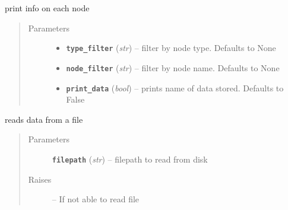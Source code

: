 \documentclass[letterpaper,10pt,english]{sphinxmanual}
\begin{document}
\begin{fulllineitems}
\begin{fulllineitems}
\end{fulllineitems}


\begin{fulllineitems}
\label{zBuilder:zBuilder.nodeCollection.NodeCollection.print_}
print info on each node
\begin{quote}\begin{description}
\item[{Parameters}] \leavevmode\begin{itemize}
\item {} 
\textbf{\texttt{type\_filter}} (\emph{str}) -- filter by node type.  Defaults to None

\item {} 
\textbf{\texttt{node\_filter}} (\emph{str}) -- filter by node name. Defaults to None

\item {} 
\textbf{\texttt{print\_data}} (\emph{bool}) -- prints name of data stored.  Defaults to False

\end{itemize}

\end{description}\end{quote}

\end{fulllineitems}


\begin{fulllineitems}
\label{zBuilder:zBuilder.nodeCollection.NodeCollection.retrieve_from_file}
reads data from a file
\begin{quote}\begin{description}
\item[{Parameters}] \leavevmode
\textbf{\texttt{filepath}} (\emph{str}) -- filepath to read from disk

\item[{Raises}] \leavevmode
{} --
If not able to read file

\end{description}\end{quote}

\end{fulllineitems}


\end{fulllineitems}
\end{document}
